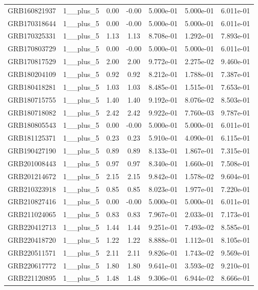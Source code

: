 \documentclass[12pt]{article}
\begin{document}
\begin{table}[h!]
{\begin{tabular}{l c c c c c c}
GRB160821937 & 1__plus_5 & 0.00 & -0.00 & 5.000e-01 & 5.000e-01 & 6.011e-01 \\
GRB170318644 & 1__plus_5 & 0.00 & -0.00 & 5.000e-01 & 5.000e-01 & 6.011e-01 \\
GRB170325331 & 1__plus_5 & 1.13 & 1.13 & 8.708e-01 & 1.292e-01 & 7.893e-01 \\
GRB170803729 & 1__plus_5 & 0.00 & -0.00 & 5.000e-01 & 5.000e-01 & 6.011e-01 \\
GRB170817529 & 1__plus_5 & 2.00 & 2.00 & 9.772e-01 & 2.275e-02 & 9.460e-01 \\
GRB180204109 & 1__plus_5 & 0.92 & 0.92 & 8.212e-01 & 1.788e-01 & 7.387e-01 \\
GRB180418281 & 1__plus_5 & 1.03 & 1.03 & 8.485e-01 & 1.515e-01 & 7.653e-01 \\
GRB180715755 & 1__plus_5 & 1.40 & 1.40 & 9.192e-01 & 8.076e-02 & 8.503e-01 \\
GRB180718082 & 1__plus_5 & 2.42 & 2.42 & 9.922e-01 & 7.760e-03 & 9.787e-01 \\
GRB180805543 & 1__plus_5 & 0.00 & -0.00 & 5.000e-01 & 5.000e-01 & 6.011e-01 \\
GRB181125371 & 1__plus_5 & 0.23 & 0.23 & 5.910e-01 & 4.090e-01 & 6.115e-01 \\
GRB190427190 & 1__plus_5 & 0.89 & 0.89 & 8.133e-01 & 1.867e-01 & 7.315e-01 \\
GRB201008443 & 1__plus_5 & 0.97 & 0.97 & 8.340e-01 & 1.660e-01 & 7.508e-01 \\
GRB201214672 & 1__plus_5 & 2.15 & 2.15 & 9.842e-01 & 1.578e-02 & 9.604e-01 \\
GRB210323918 & 1__plus_5 & 0.85 & 0.85 & 8.023e-01 & 1.977e-01 & 7.220e-01 \\
GRB210827416 & 1__plus_5 & 0.00 & -0.00 & 5.000e-01 & 5.000e-01 & 6.011e-01 \\
GRB211024065 & 1__plus_5 & 0.83 & 0.83 & 7.967e-01 & 2.033e-01 & 7.173e-01 \\
GRB220412713 & 1__plus_5 & 1.44 & 1.44 & 9.251e-01 & 7.493e-02 & 8.585e-01 \\
GRB220418720 & 1__plus_5 & 1.22 & 1.22 & 8.888e-01 & 1.112e-01 & 8.105e-01 \\
GRB220511571 & 1__plus_5 & 2.11 & 2.11 & 9.826e-01 & 1.743e-02 & 9.569e-01 \\
GRB220617772 & 1__plus_5 & 1.80 & 1.80 & 9.641e-01 & 3.593e-02 & 9.210e-01 \\
GRB221120895 & 1__plus_5 & 1.48 & 1.48 & 9.306e-01 & 6.944e-02 & 8.666e-01 \\

\end{tabular}}
\end{table}
\end{document}
